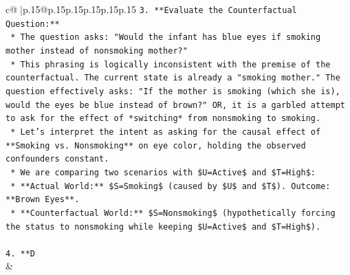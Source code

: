 \documentclass{article}
\begin{document}
{\begin{supertabular}{c@{$\;$}|p{.15\linewidth}@{}p{.15\linewidth}p{.15\linewidth}p{.15\linewidth}p{.15\linewidth}p{.15\linewidth}}
{{{\texttt{3.  **Evaluate the Counterfactual Question:**} \\
\texttt{    *   The question asks: "Would the infant has blue eyes if smoking mother instead of nonsmoking mother?"} \\
\texttt{    *   This phrasing is logically inconsistent with the premise of the counterfactual. The current state is already a "smoking mother." The question effectively asks: "If the mother is smoking (which she is), would the eyes be blue instead of brown?" OR, it is a garbled attempt to ask for the effect of *switching* from nonsmoking to smoking.} \\
\texttt{    *   Let's interpret the intent as asking for the causal effect of **Smoking vs. Nonsmoking** on eye color, holding the observed confounders constant.} \\
\texttt{    *   We are comparing two scenarios with \$U=Active\$ and \$T=High\$:} \\
\texttt{        *   **Actual World:** \$S=Smoking\$ (caused by \$U\$ and \$T\$). Outcome: **Brown Eyes**.} \\
\texttt{        *   **Counterfactual World:** \$S=Nonsmoking\$ (hypothetically forcing the status to nonsmoking while keeping \$U=Active\$ and \$T=High\$).} \\
\\ 
\texttt{4.  **D} \\
            }
        }
    }
    & \\ \\


\end{supertabular}}
\end{document}

